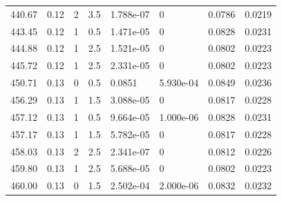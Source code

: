 \documentclass[preview]{standalone}
\begin{document}
{{{\begin{tabular}{L{1.2cm}C{1.2cm} C{0.3cm}C{0.5cm} C{1.4cm}C{1.4cm} C{1.4cm}C{1.4cm}}
  440.67  &  0.12  & 2     & 3.5 &  1.788e-07  & 0  & 0.0786 &  0.0219   \\ 
  443.45  &  0.12  & 1     & 0.5 &  1.471e-05  & 0  & 0.0828 &  0.0231   \\ 
  444.88  &  0.12  & 1     & 2.5 &  1.521e-05  & 0  & 0.0802 &  0.0223   \\ 
  445.72  &  0.12  & 1     & 2.5 &  2.331e-05  & 0  & 0.0802 &  0.0223   \\ 
  450.71  &  0.13  & 0     & 0.5 &  0.0851  & 5.930e-04  & 0.0849 &  0.0236   \\ 
  456.29  &  0.13  & 1     & 1.5 &  3.088e-05  & 0  & 0.0817 &  0.0228   \\ 
  457.12  &  0.13  & 1     & 0.5 &  9.664e-05  & 1.000e-06  & 0.0828 &  0.0231   \\ 
  457.17  &  0.13  & 1     & 1.5 &  5.782e-05  & 0  & 0.0817 &  0.0228   \\ 
  458.03  &  0.13  & 2     & 2.5 &  2.341e-07  & 0  & 0.0812 &  0.0226   \\ 
  459.80  &  0.13  & 1     & 2.5 &  5.688e-05  & 0  & 0.0802 &  0.0223   \\ 
  460.00  &  0.13  & 0     & 1.5 &  2.502e-04  & 2.000e-06  & 0.0832 &  0.0232   \\ 
\hline 
\end{tabular} 

}}}
\end{document}
